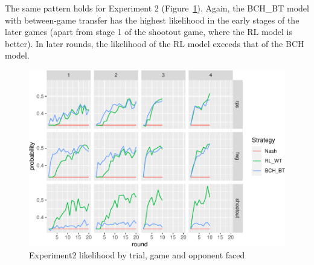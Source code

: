 \documentclass[
  english,
  man,floatsintext]{apa6}
\begin{document}
The same pattern holds for Experiment 2 (Figure~\ref{fig:exp2-lik-by-tr}). Again, the BCH\_BT model with between-game transfer has the highest likelihood in the early stages of the later games (apart from stage 1 of the shootout game, where the RL model is better). In later rounds, the likelihood of the RL model exceeds that of the BCH model.

\begin{figure}

{\centering \includegraphics{paper_draft_2021_files/figure-latex/exp2-lik-by-tr-1} 

}

\caption{Experiment2 likelihood by trial, game and opponent faced}\label{fig:exp2-lik-by-tr}
\end{figure}
\end{document}

